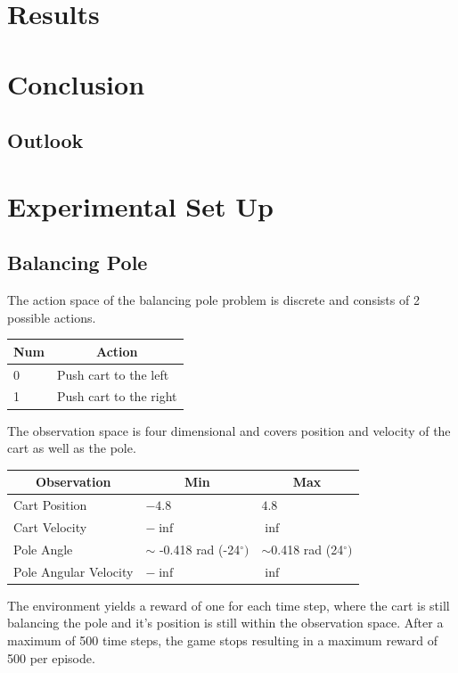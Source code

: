 \documentclass[10pt]{reportMaster}
\begin{document}
\chapter{Results} \label{Results}

\chapter{Conclusion} \label{Conclusion}

\section{Outlook} \label{Outlook}




\appendix

\chapter{Experimental Set Up}

\section{Balancing Pole} \label{Balancing Pole Appendix}

The action space of the balancing pole problem is discrete and consists of 2 possible actions. 

\begin{table}[h]
\centering
\label{tab:actions-bp}
\begin{tabular}{ll}
\multicolumn{1}{c}{\textbf{Num}} & \multicolumn{1}{c}{\textbf{Action}} \\ \hline
0                                & Push cart to the left               \\
1                                & Push cart to the right             
\end{tabular}
\end{table}

The observation space is four dimensional and covers position and velocity of the cart as well as the pole. 

\begin{table}[h]
\centering
\label{tab:observations-bp}
\begin{tabular}{lll}
\multicolumn{1}{c}{\textbf{Observation}} & \multicolumn{1}{c}{\textbf{Min}} & \multicolumn{1}{c}{\textbf{Max}} \\ \hline
Cart Position                            & $-4.8     $                        & $4.8        $                      \\
Cart Velocity                            & $-\inf$                             & $\inf$                              \\
Pole Angle                               & $\sim$ -0.418 rad (-24$^{\circ}) $         & $\sim$0.418 rad (24$^{\circ}) $           \\
Pole Angular Velocity                    & $-\inf$                             & $\inf$                             
\end{tabular}
\end{table}

The environment yields a reward of one for each time step, where the cart is still balancing the pole and it's position is still within the observation space. After a maximum of 500 time steps, the game stops resulting in a maximum reward of 500 per episode. 
\end{document}
